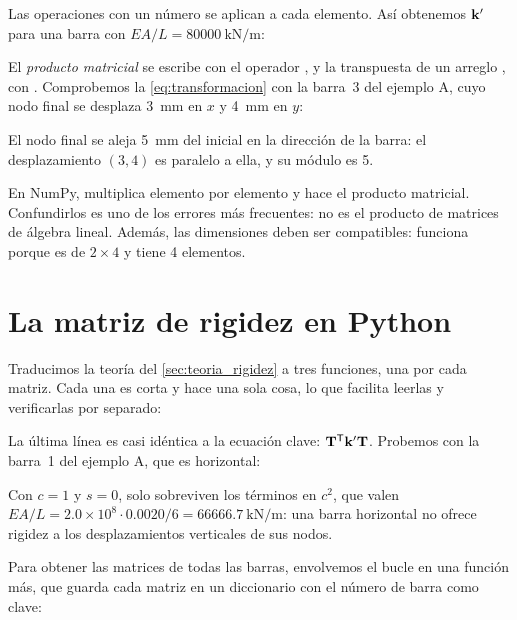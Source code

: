 Las operaciones con un número se aplican a cada elemento. Así obtenemos
$\mathbf{k}'$ para una barra con $EA/L = \SI{80000}{\kilo\newton\per\metre}$:

El \emph{producto matricial} se escribe con el operador , y la
transpuesta de un arreglo , con . Comprobemos la
\cref{eq:transformacion} con la barra~3 del ejemplo A, cuyo nodo final se
desplaza \SI{3}{\milli\metre} en $x$ y \SI{4}{\milli\metre} en $y$:

El nodo final se aleja \SI{5}{\milli\metre} del inicial en la dirección de
la barra: el desplazamiento $(3, 4)$ es paralelo a ella, y su módulo es 5.

\begin{cuidado}
En NumPy, \py{*} multiplica elemento por elemento y  hace el producto
matricial. Confundirlos es uno de los errores más frecuentes:  no
es el producto de matrices de álgebra lineal. Además, las dimensiones deben
ser compatibles:  funciona porque  es de $2\times4$ y
 tiene 4 elementos.
\end{cuidado}

\section{La matriz de rigidez en Python}\label{sec:rigidez_python}

Traducimos la teoría del \cref{sec:teoria_rigidez} a tres funciones, una por
cada matriz. Cada una es corta y hace una sola cosa, lo que facilita leerlas
y verificarlas por separado:

La última línea es casi idéntica a la ecuación clave: $\mathbf{T}^\mathsf{T}\mathbf{k}'\mathbf{T}$.
Probemos con la barra~1 del ejemplo A, que es horizontal:

Con $c = 1$ y $s = 0$, solo sobreviven los términos en $c^2$, que valen
$EA/L = 2.0\times10^8 \cdot 0.0020/6 = \SI{66666.7}{\kilo\newton\per\metre}$:
una barra horizontal no ofrece rigidez a los desplazamientos verticales de
sus nodos.

Para obtener las matrices de todas las barras, envolvemos el bucle en una
función más, que guarda cada matriz en un diccionario con el número de barra
como clave:

